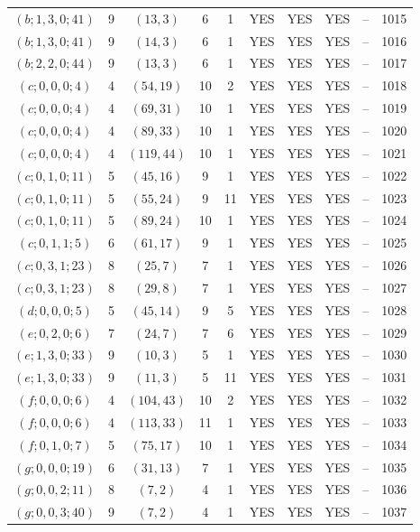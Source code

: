 \begin{longtable}{|c|c|c|c|c|c|c|c|c|c|}
$(b; 1, 3, 0; 41)$ & 9 & $(13, 3)$ & 6 & 1 & YES & YES & YES & -- & 1015\\
$(b; 1, 3, 0; 41)$ & 9 & $(14, 3)$ & 6 & 1 & YES & YES & YES & -- & 1016\\
$(b; 2, 2, 0; 44)$ & 9 & $(13, 3)$ & 6 & 1 & YES & YES & YES & -- & 1017\\
$(c; 0, 0, 0; 4)$ & 4 & $(54, 19)$ & 10 & 2 & YES & YES & YES & -- & 1018\\
$(c; 0, 0, 0; 4)$ & 4 & $(69, 31)$ & 10 & 1 & YES & YES & YES & -- & 1019\\
$(c; 0, 0, 0; 4)$ & 4 & $(89, 33)$ & 10 & 1 & YES & YES & YES & -- & 1020\\
$(c; 0, 0, 0; 4)$ & 4 & $(119, 44)$ & 10 & 1 & YES & YES & YES & -- & 1021\\
$(c; 0, 1, 0; 11)$ & 5 & $(45, 16)$ & 9 & 1 & YES & YES & YES & -- & 1022\\
$(c; 0, 1, 0; 11)$ & 5 & $(55, 24)$ & 9 & 11 & YES & YES & YES & -- & 1023\\
$(c; 0, 1, 0; 11)$ & 5 & $(89, 24)$ & 10 & 1 & YES & YES & YES & -- & 1024\\
$(c; 0, 1, 1; 5)$ & 6 & $(61, 17)$ & 9 & 1 & YES & YES & YES & -- & 1025\\
$(c; 0, 3, 1; 23)$ & 8 & $(25, 7)$ & 7 & 1 & YES & YES & YES & -- & 1026\\
$(c; 0, 3, 1; 23)$ & 8 & $(29, 8)$ & 7 & 1 & YES & YES & YES & -- & 1027\\
$(d; 0, 0, 0; 5)$ & 5 & $(45, 14)$ & 9 & 5 & YES & YES & YES & -- & 1028\\
$(e; 0, 2, 0; 6)$ & 7 & $(24, 7)$ & 7 & 6 & YES & YES & YES & -- & 1029\\
$(e; 1, 3, 0; 33)$ & 9 & $(10, 3)$ & 5 & 1 & YES & YES & YES & -- & 1030\\
$(e; 1, 3, 0; 33)$ & 9 & $(11, 3)$ & 5 & 11 & YES & YES & YES & -- & 1031\\
$(f; 0, 0, 0; 6)$ & 4 & $(104, 43)$ & 10 & 2 & YES & YES & YES & -- & 1032\\
$(f; 0, 0, 0; 6)$ & 4 & $(113, 33)$ & 11 & 1 & YES & YES & YES & -- & 1033\\
$(f; 0, 1, 0; 7)$ & 5 & $(75, 17)$ & 10 & 1 & YES & YES & YES & -- & 1034\\
$(g; 0, 0, 0; 19)$ & 6 & $(31, 13)$ & 7 & 1 & YES & YES & YES & -- & 1035\\
$(g; 0, 0, 2; 11)$ & 8 & $(7, 2)$ & 4 & 1 & YES & YES & YES & -- & 1036\\
$(g; 0, 0, 3; 40)$ & 9 & $(7, 2)$ & 4 & 1 & YES & YES & YES & -- & 1037\\

\end{longtable}
